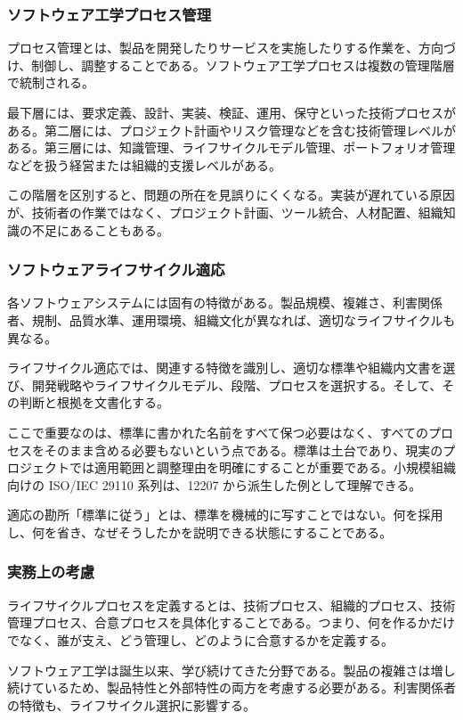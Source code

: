 \documentclass[a4paper,11pt]{ltjsarticle}
\numberwithin{figure}{section}
\numberwithin{table}{section}
\begin{document}
\subsubsection{ソフトウェア工学プロセス管理}
プロセス管理とは、製品を開発したりサービスを実施したりする作業を、方向づけ、制御し、調整することである。ソフトウェア工学プロセスは複数の管理階層で統制される。

最下層には、要求定義、設計、実装、検証、運用、保守といった技術プロセスがある。第二層には、プロジェクト計画やリスク管理などを含む技術管理レベルがある。第三層には、知識管理、ライフサイクルモデル管理、ポートフォリオ管理などを扱う経営または組織的支援レベルがある。

この階層を区別すると、問題の所在を見誤りにくくなる。実装が遅れている原因が、技術者の作業ではなく、プロジェクト計画、ツール統合、人材配置、組織知識の不足にあることもある。

\subsubsection{ソフトウェアライフサイクル適応}
各ソフトウェアシステムには固有の特徴がある。製品規模、複雑さ、利害関係者、規制、品質水準、運用環境、組織文化が異なれば、適切なライフサイクルも異なる。

ライフサイクル適応では、関連する特徴を識別し、適切な標準や組織内文書を選び、開発戦略やライフサイクルモデル、段階、プロセスを選択する。そして、その判断と根拠を文書化する。

ここで重要なのは、標準に書かれた名前をすべて保つ必要はなく、すべてのプロセスをそのまま含める必要もないという点である。標準は土台であり、現実のプロジェクトでは適用範囲と調整理由を明確にすることが重要である。小規模組織向けの ISO/IEC 29110 系列は、12207 から派生した例として理解できる。

\begin{pointbox}{適応の勘所}「標準に従う」とは、標準を機械的に写すことではない。何を採用し、何を省き、なぜそうしたかを説明できる状態にすることである。\end{pointbox}
\subsubsection{実務上の考慮}
ライフサイクルプロセスを定義するとは、技術プロセス、組織的プロセス、技術管理プロセス、合意プロセスを具体化することである。つまり、何を作るかだけでなく、誰が支え、どう管理し、どのように合意するかを定義する。

ソフトウェア工学は誕生以来、学び続けてきた分野である。製品の複雑さは増し続けているため、製品特性と外部特性の両方を考慮する必要がある。利害関係者の特徴も、ライフサイクル選択に影響する。
\end{document}
